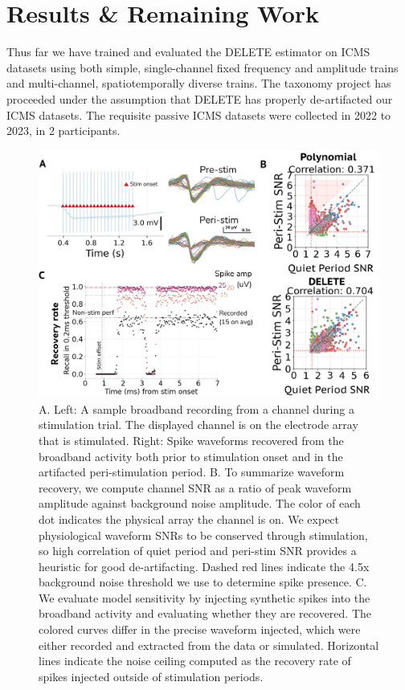 \documentclass[12pt,oneside]{report}
\begin{document}
\section{Results \& Remaining Work}
Thus far we have trained and evaluated the DELETE estimator on ICMS datasets using both simple, single-channel fixed frequency and amplitude trains and multi-channel, spatiotemporally diverse trains. The taxonomy project has proceeded under the assumption that DELETE has properly de-artifacted our ICMS datasets. The requisite passive ICMS datasets were collected in 2022 to 2023, in 2 participants.

\begin{figure}[h]
  \centering
  \includegraphics[width=0.8\linewidth]{ch4_delete_peristim.png}
  \caption{A. Left: A sample broadband recording from a channel during a stimulation trial. The displayed channel is on the electrode array that is stimulated. Right: Spike waveforms recovered from the broadband activity both prior to stimulation onset and in the artifacted peri-stimulation period. B. To summarize waveform recovery, we compute channel SNR as a ratio of peak waveform amplitude against background noise amplitude. The color of each dot indicates the physical array the channel is on. We expect physiological waveform SNRs to be conserved through stimulation, so high correlation of quiet period and peri-stim SNR provides a heuristic for good de-artifacting. Dashed red lines indicate the 4.5x background noise threshold we use to determine spike presence. C. We evaluate model sensitivity by injecting synthetic spikes into the broadband activity and evaluating whether they are recovered. The colored curves differ in the precise waveform injected, which were either recorded and extracted from the data or simulated. Horizontal lines indicate the noise ceiling computed as the recovery rate of spikes injected outside of stimulation periods.}
  \label{fig:delete_peristim}
\end{figure}
\end{document}
